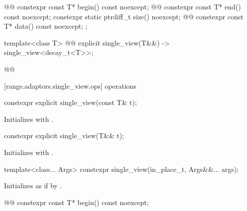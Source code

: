 {\begin{codeblock}
{{    @@
    constexpr const T* begin() const noexcept;
    @@
    constexpr const T* end() const noexcept;
    constexpr static ptrdiff_t size() noexcept;
    @@
    constexpr const T* data() const noexcept;
  };

  template<class T>
    @@
  explicit single_view(T&&) -> single_view<decay_t<T>>;
}@\oldtxt{\}}@
\end{codeblock}

[range.adaptors.single_view.ops]{ operations}

%
\begin{itemdecl}
constexpr explicit single_view(const T& t);
\end{itemdecl}

\begin{itemdescr}
\pnum
\effects Initializes  with .
\end{itemdescr}

%
\begin{itemdecl}
constexpr explicit single_view(T&& t);
\end{itemdecl}

\begin{itemdescr}
\pnum
\effects Initializes  with .
\end{itemdescr}

%
\begin{itemdecl}
template<class... Args>
constexpr single_view(in_place_t, Args&&... args);
\end{itemdecl}

\begin{itemdescr}
\pnum
\effects Initializes  as if by
.
\end{itemdescr}

%
\begin{itemdecl}
@@
constexpr const T* begin() const noexcept;
\end{itemdecl}

\begin{itemdescr}
\pnum
{}


\end{itemdescr}}
